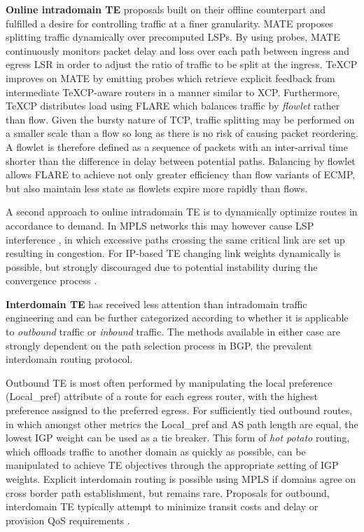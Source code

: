 \textbf{Online intradomain \ac{TE}} proposals built on their offline counterpart and fulfilled a desire for controlling traffic at a finer granularity. 
\ac{MATE} \cite{Elwalid:2002p153} proposes splitting traffic dynamically over precomputed \acp{LSP}. 
By using probes, \ac{MATE} continuously monitors packet delay and loss over each path between ingress and egress \ac{LSR} in order to adjust the ratio of traffic to be split at the ingress.
\ac{TeXCP} \cite{Kandula:2005p90} improves on \ac{MATE} by emitting probes which retrieve explicit feedback from intermediate \ac{TeXCP}-aware routers in a manner similar to \ac{XCP}.
Furthermore, \ac{TeXCP} distributes load using \ac{FLARE} \cite{Sinha:2004p124} which balances traffic by \emph{flowlet} rather than flow.
Given the bursty nature of \ac{TCP}, traffic splitting may be performed on a smaller scale than a flow so long as there is no risk of causing packet reordering.
A flowlet is therefore defined as a sequence of packets with an inter-arrival time shorter than the difference in delay between potential paths.
Balancing by flowlet allows \ac{FLARE} to achieve not only greater efficiency than flow variants of \ac{ECMP}, but also maintain less state as flowlets expire more rapidly than flows.

A second approach to online intradomain \ac{TE} is to dynamically optimize routes in accordance to demand.
In \ac{MPLS} networks this may however cause \ac{LSP} interference \cite{Kodialam:2000p508}, in which excessive paths crossing the same critical link are set up resulting in congestion.
For IP-based \ac{TE} changing link weights dynamically is possible, but strongly discouraged due to potential instability during the convergence process \cite{Labovitz:1998p505}.


\textbf{Interdomain \ac{TE}} has received less attention than intradomain traffic engineering and can be further categorized according to whether it is applicable to \emph{outbound} traffic or \emph{inbound} traffic. The methods available in either case are strongly dependent on the path selection process \cite{Quoitin:2003p218} in \ac{BGP}, the prevalent interdomain routing protocol.

Outbound \ac{TE} is most often performed by manipulating the local preference (Local\_pref) attribute of a route for each egress router, with the highest preference assigned to the preferred egress.
For sufficiently tied outbound routes, in which amongst other metrics the Local\_pref and \ac{AS} path length are equal, the lowest \ac{IGP} weight can be used as a tie breaker. This form of \emph{hot potato} routing, which offloads traffic to another domain as quickly as possible, can be manipulated to achieve \ac{TE} objectives through the appropriate setting of \ac{IGP} weights.
Explicit interdomain routing is possible using \ac{MPLS} if domains agree on cross border path establishment, but remains rare.
Proposals for outbound, interdomain \ac{TE} typically attempt to minimize transit costs and delay \cite{Uhlig:2004p144,Goldenberg:2004p93} or provision \ac{QoS} requirements \cite{Howarth:2005p511}.

